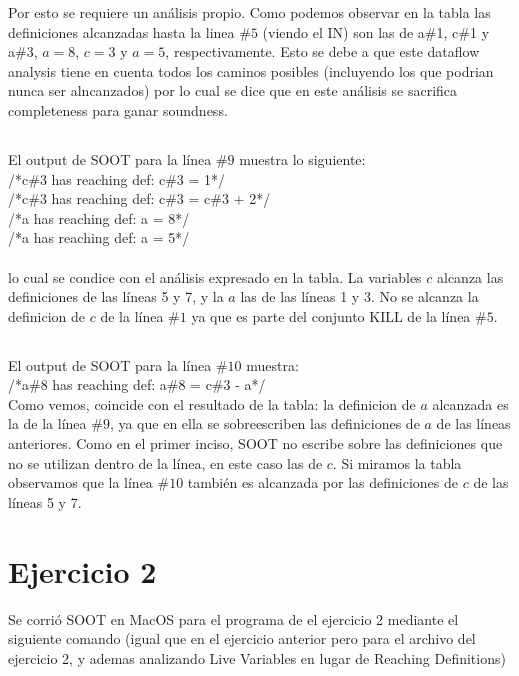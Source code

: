 Por esto se requiere un análisis propio. Como podemos observar en la tabla las
definiciones alcanzadas hasta la linea $\#5$ (viendo el IN) son las de a\#1, c\#1
y a\#3, $a = 8$, $c = 3$ y $a = 5$, respectivamente. Esto se debe a que este
dataflow analysis tiene en cuenta todos los caminos posibles
(incluyendo los que podrian nunca ser alncanzados) por lo cual se dice que en
este análisis se sacrifica completeness para ganar soundness.

\subsection{}
El output de SOOT para la línea $\#9$ muestra lo siguiente:
\\

/*c\#3 has reaching def: c\#3 = 1*/ \\

/*c\#3 has reaching def: c\#3 = c\#3 + 2*/ \\

/*a has reaching def: a = 8*/ \\

/*a has reaching def: a = 5*/ \\
\\

lo cual se condice con el análisis expresado en la tabla. La variables $c$
alcanza las definiciones de las líneas 5 y 7, y la $a$ las de las líneas 1 y 3.
No se alcanza la definicion de $c$ de la línea $\#1$ ya que es parte del
conjunto KILL de la línea $\#5$.

\subsection{}
El output de SOOT para la línea $\#10$ muestra:
\\

/*a\#8 has reaching def: a\#8 = c\#3 - a*/ \\

Como vemos, coincide con el resultado de la tabla: la definicion de $a$ 
alcanzada es la de la línea $\#9$, ya que en ella se sobreescriben las
definiciones de $a$ de las líneas anteriores. Como en el primer inciso, SOOT no
escribe sobre las definiciones que no se utilizan dentro de la línea, en este
caso las de $c$. Si miramos la tabla observamos que la línea $\#10$ también es
alcanzada por las definiciones de $c$ de las líneas 5 y 7.

\section*{Ejercicio 2}
\setcounter{section}{2}
Se corrió SOOT en MacOS para el programa de el ejercicio 2 mediante el
siguiente comando (igual que en el ejercicio anterior pero para el archivo del
ejercicio 2, y ademas analizando Live Variables en lugar de Reaching Definitions)
\\

